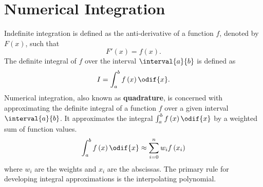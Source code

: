 \documentclass{article}
\begin{document}
\section{Numerical Integration}
Indefinite integration is defined as the anti-derivative of a function
\(f\), denoted by \(F\left( x \right)\), such that
\begin{equation*}
    F'\left( x \right) = f\left( x \right).
\end{equation*}
The definite integral of \(f\) over the interval \(\interval{a}{b}\) is
defined as
\begin{equation*}
    I = \int_a^b f\left( x \right) \odif{x}.
\end{equation*}
Numerical integration, also known as \textbf{quadrature}, is concerned
with approximating the definite integral of a function \(f\) over a
given interval \(\interval{a}{b}\). It approximates the integral
\(\int_a^b f\left( x \right) \odif{x}\) by a weighted sum of function
values.
\begin{equation*}
    \int_a^b f\left( x \right) \odif{x} \approx \sum_{i = 0}^n w_i f\left( x_i \right)
\end{equation*}
where \(w_i\) are the weights and \(x_i\) are the abscissas. The primary
rule for developing integral approximations is the interpolating
polynomial.
\end{document}
